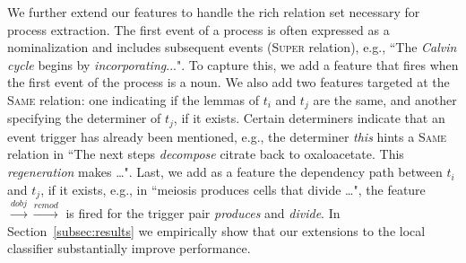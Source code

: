 
We further extend our features to handle the rich relation set necessary for process extraction. The first event of a process is often expressed as a nominalization and includes subsequent events (\textsc{Super} relation), e.g., ``The \emph{Calvin cycle} begins by \emph{incorporating}...". To capture this, we add a feature that fires when the first event of the process is a noun. We also add two features targeted at the \textsc{Same} relation: one indicating if the lemmas of $t_i$ and $t_j$ are the same, and another specifying the determiner of $t_j$, if it exists. Certain determiners indicate that an event trigger has already been mentioned, e.g., the determiner \emph{this} hints a \textsc{Same} relation in ``The next steps \emph{decompose} citrate back to oxaloacetate. This \emph{regeneration} makes \ldots". Last, we add as a feature the dependency path between $t_i$ and $t_j$, if it exists, e.g., in ``meiosis produces cells that divide \ldots", the feature $\xrightarrow{\scriptscriptstyle dobj} \xrightarrow{\scriptscriptstyle rcmod}$ is fired for the trigger pair \emph{produces} and \emph{divide}. In Section~\ref{subsec:results} we empirically show that our extensions to the local classifier substantially improve performance.

